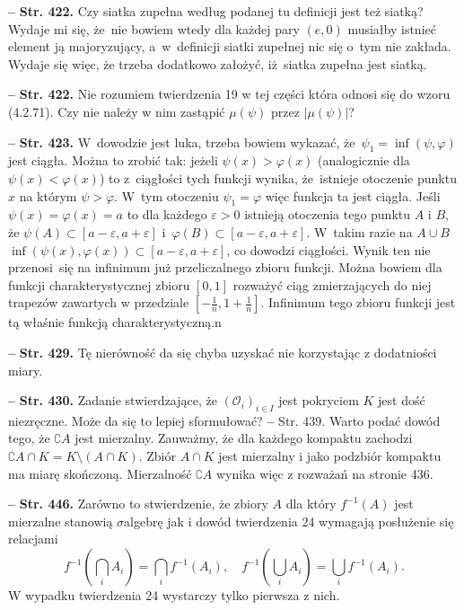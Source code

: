 \documentclass[a4paper]{article}
\newcommand{\mc}{\mathcal}
\newcommand{\s}{\sigma}
\newcommand{\veps}{\varepsilon}
\newcommand{\vp}{\varphi}
\newcommand{\tb}{\textbf}
\newcommand{\noi}{\noindent}
\newcommand{\start}{\noi \tb{--} {}}
\newcommand{\Str}[1]{\tb{Str. #1.}}
\begin{document}
\start \Str{422} Czy siatka zupełna według podanej tu definicji jest
też siatką? Wydaje mi się, że~nie bowiem wtedy dla każdej pary
$(e, 0)$ musiałby istnieć element ją majoryzujący, a~w~definicji
siatki zupełnej nic się o~tym nie zakłada. Wydaje się więc, że trzeba
dodatkowo założyć, iż~siatka zupełna jest siatką.

\start \Str{422} Nie rozumiem twierdzenia 19 w tej części która odnosi
się do wzoru (4.2.71). Czy nie należy w nim zastąpić $\mu( \psi )$
przez $| \mu( \psi ) |$?

\start \Str{423} W~dowodzie jest luka, trzeba bowiem wykazać,
że~$\psi_{ 1 } = \inf( \psi, \vp )$ jest ciągła. Można to zrobić tak:
jeżeli $\psi( x ) > \vp( x )$ (analogicznie dla
$\psi( x ) < \varphi( x )$) to z~ciągłości tych funkcji wynika,
że~istnieje otoczenie punktu $x$ na którym $\psi > \vp$. W~tym
otoczeniu $\psi_{ 1 } = \vp$ więc funkcja ta jest ciągła. Jeśli
$\psi( x ) = \vp( x ) = a$ to dla każdego $\veps > 0$ istnieją
otoczenia tego punktu $A$ i $B$, że
$\psi( A ) \subset [ a - \veps, a + \veps ]$
i~$\varphi( B ) \subset [ a - \veps, a + \veps ]$. W~takim razie na
$A \cup B$
$\inf( \psi( x ), \vp( x ) ) \subset [ a - \veps, a + \veps ]$, co
dowodzi ciągłości. Wynik ten nie przenosi~się na infinimum już
przeliczalnego zbioru funkcji. Można bowiem dla funkcji
charakterystycznej zbioru $[0, 1]$ rozważyć ciąg zmierzających do niej
trapezów zawartych w przedziale
$[-\frac{ 1 }{ n }, 1 + \frac{ 1 }{ n } ]$. Infinimum tego zbioru
funkcji jest tą właśnie funkcją charakterystyczną.n

\start \Str{429} Tę nierówność da się chyba uzyskać nie korzystając z
dodatniości miary.

\start \Str{430} Zadanie stwierdzające, że
$( \mc{O}_{ i } )_{ i \in I }$ jest pokryciem $K$ jest dość
niezręczne. Może da się to lepiej sformułować? \start Str. 439. Warto
podać dowód tego, że $\complement A$ jest mierzalny. Zauważmy, że dla
każdego kompaktu zachodzi
$\complement A \cap K = K \setminus ( A \cap K )$. Zbiór $A \cap K$
jest mierzalny i jako podzbiór kompaktu ma miarę skończoną.
Mierzalność $\complement A$ wynika więc z rozważań na stronie 436.

\start \Str{446} Zarówno to stwierdzenie, że zbiory $A$ dla który
$f^{ -1 }( A )$ jest mierzalne stanowią $\s$\dywiz algebrę jak i dowód
twierdzenia 24 wymagają posłużenie się relacjami
\begin{displaymath}
  f^{ -1 }( \bigcap_{ i } A_{ i } ) = \bigcap_{ i } f^{ -1 }( A_{ i } ),
  \quad f^{ -1 }( \bigcup_{ i } A_{ i } ) = \bigcup_{ i }
  f^{ -1 }( A_{ i } ).
\end{displaymath}
W wypadku twierdzenia 24 wystarczy tylko pierwsza z nich.
\end{document}
